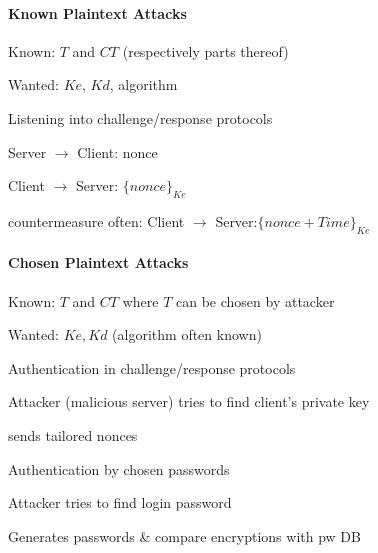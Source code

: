 \documentclass[a4paper]{article}
\begin{document}
\begin{multicols}{3}
    \paragraph{Known Plaintext Attacks}
    \begin{itemize*}
        \item Known: $T$ and $CT$ (respectively parts thereof)
        \item Wanted: $Ke$, $Kd$, algorithm
        \item Listening into challenge/response protocols
        \begin{itemize*}
            \item Server $\rightarrow$ Client: nonce
            \item Client $\rightarrow$ Server: $\{nonce\}_{Ke}$
        \end{itemize*}
        \item countermeasure often: Client $\rightarrow$ Server:$\{nonce + Time\}_{Ke}$
    \end{itemize*}

    \paragraph{Chosen Plaintext Attacks}
    \begin{itemize*}
        \item Known: $T$ and $CT$ where $T$ can be chosen by attacker
        \item Wanted: $Ke, Kd$ (algorithm often known)
        \item Authentication in challenge/response protocols
        \begin{itemize*}
            \item Attacker (malicious server) tries to find client’s private key
            \item sends tailored nonces
        \end{itemize*}
        \item Authentication by chosen passwords
        \begin{itemize*}
            \item Attacker tries to find login password
            \item Generates passwords \& compare encryptions with pw DB
        \end{itemize*}
    \end{itemize*}


\end{multicols}
\end{document}
